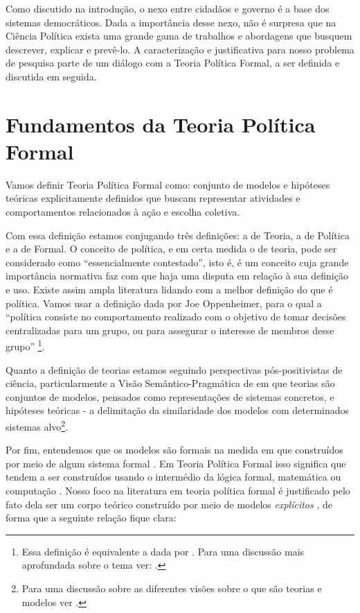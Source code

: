 Como discutido na introdução, o nexo entre cidadãos e governo é a base dos
sistemas democráticos. Dada a importância desse nexo, não é surpresa que na
Ciência Política exista uma grande gama de trabalhos e abordagens que busquem
descrever, explicar e prevê-lo. A caracterização e
justificativa para nosso problema de pesquisa parte de um diálogo com a Teoria
Política Formal, a ser definida e discutida em seguida.

\section{Fundamentos da Teoria Política Formal}

Vamos definir Teoria Política Formal como: conjunto de modelos e hipóteses
teóricas explicitamente definidos que buscam representar atividades e
comportamentos relacionados à ação e escolha coletiva.

Com essa definição estamos conjugando três definições: a de Teoria, a de
Política e a de Formal. O conceito de política, e em certa medida o de teoria,
pode ser considerado como ``essencialmente contestado'', isto é, é um conceito
cuja grande importância normativa faz com que haja uma disputa em relação à sua
definição e uso\cite{collier2006essentially}. Existe assim ampla literatura
lidando com a melhor definição do que é política. Vamos usar a definição
dada por Joe Oppenheimer, para o qual  a ``política consiste
no comportamento realizado com o objetivo de tomar decisões centralizadas para
um grupo, ou para assegurar o interesse de membros desse grupo'' \cite[p.
I]{oppenheimer2012principles}\footnote{Essa definição é equivalente a dada por
  . Para uma discussão mais aprofundada sobre o
  tema ver: .}.

Quanto a definição de teorias estamos seguindo perspectivas pós-positivistas de
ciência, particularmente a Visão Semântico-Pragmática de
 em que teorias são conjuntos de modelos, pensados
como representações de sistemas concretos, e hipóteses teóricas - a delimitação
da similaridade dos modelos com determinados sistemas alvo\footnote{Para uma
  discussão sobre as diferentes visões sobre o que são teorias e modelos ver
  .}.

Por fim, entendemos que os modelos são formais na medida em que construídos por
meio de algum sistema formal \cite{wong2015formal}. Em Teoria Política Formal
isso significa que tendem a ser construídos usando o intermédio da lógica formal,
matemática ou computação \cite{morton1999methods}. Nosso foco na literatura em
teoria política formal é justificado pelo fato dela ser um corpo teórico
construído por meio de modelos \textit{explícitos} \cite{epstein2008model}, de
forma que a seguinte relação fique clara:

